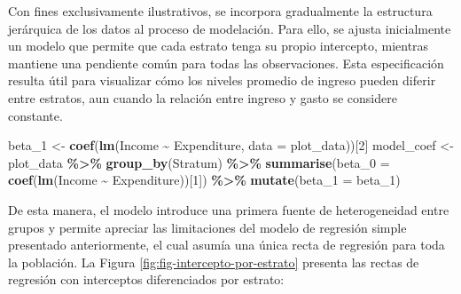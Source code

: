 \documentclass[
  spanish,
  12pt,
]{book}
\newenvironment{Shaded}{\begin{snugshade}}{\end{snugshade}}
\newcommand{\AttributeTok}[1]{\textcolor[rgb]{0.13,0.29,0.53}{#1}}
\newcommand{\DecValTok}[1]{\textcolor[rgb]{0.00,0.00,0.81}{#1}}
\newcommand{\FunctionTok}[1]{\textcolor[rgb]{0.13,0.29,0.53}{\textbf{#1}}}
\newcommand{\NormalTok}[1]{#1}
\newcommand{\OtherTok}[1]{\textcolor[rgb]{0.56,0.35,0.01}{#1}}
\newcommand{\SpecialCharTok}[1]{\textcolor[rgb]{0.81,0.36,0.00}{\textbf{#1}}}
\begin{document}
Con fines exclusivamente ilustrativos, se incorpora gradualmente la estructura jerárquica de los datos al proceso de modelación. Para ello, se ajusta inicialmente un modelo que permite que cada estrato tenga su propio intercepto, mientras mantiene una pendiente común para todas las observaciones. Esta especificación resulta útil para visualizar cómo los niveles promedio de ingreso pueden diferir entre estratos, aun cuando la relación entre ingreso y gasto se considere constante.

\begin{Shaded}
\begin{Highlighting}[]
\NormalTok{beta\_1 }\OtherTok{\textless{}{-}} \FunctionTok{coef}\NormalTok{(}\FunctionTok{lm}\NormalTok{(Income }\SpecialCharTok{\textasciitilde{}}\NormalTok{ Expenditure, }\AttributeTok{data =}\NormalTok{ plot\_data))[}\DecValTok{2}\NormalTok{]}
\NormalTok{model\_coef }\OtherTok{\textless{}{-}}\NormalTok{ plot\_data }\SpecialCharTok{\%\textgreater{}\%}
  \FunctionTok{group\_by}\NormalTok{(Stratum) }\SpecialCharTok{\%\textgreater{}\%}
  \FunctionTok{summarise}\NormalTok{(}\AttributeTok{beta\_0 =} \FunctionTok{coef}\NormalTok{(}\FunctionTok{lm}\NormalTok{(Income }\SpecialCharTok{\textasciitilde{}}\NormalTok{ Expenditure))[}\DecValTok{1}\NormalTok{]) }\SpecialCharTok{\%\textgreater{}\%}
  \FunctionTok{mutate}\NormalTok{(}\AttributeTok{beta\_1 =}\NormalTok{ beta\_1)}
\end{Highlighting}
\end{Shaded}

De esta manera, el modelo introduce una primera fuente de heterogeneidad entre grupos y permite apreciar las limitaciones del modelo de regresión simple presentado anteriormente, el cual asumía una única recta de regresión para toda la población. La Figura \ref{fig:fig-intercepto-por-estrato} presenta las rectas de regresión con interceptos diferenciados por estrato:
\end{document}
